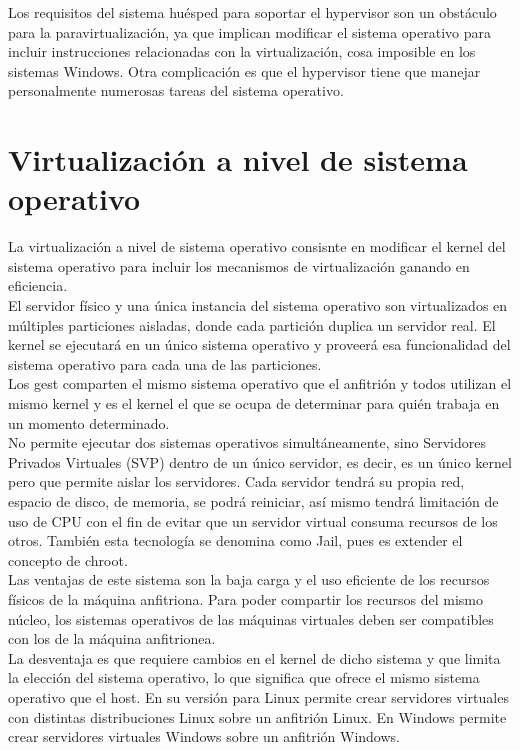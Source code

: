 \documentclass[10pt,a4paper,spanish]{report}
\begin{document}
  \noindent
  Los requisitos del sistema huésped para soportar el hypervisor son un obstáculo para la paravirtualización, ya que implican modificar el sistema operativo para incluir instrucciones relacionadas con la virtualización, cosa imposible en los sistemas Windows. Otra complicación es que el hypervisor tiene que manejar personalmente numerosas tareas del sistema operativo.

  \section{Virtualización a nivel de sistema operativo}

  \noindent
  La virtualización a nivel de sistema operativo consisnte en modificar el kernel del sistema operativo para incluir los mecanismos de virtualización ganando en eficiencia. \\

  \noindent
  El servidor físico y una única instancia del sistema operativo son virtualizados en múltiples particiones aisladas, donde cada partición duplica un servidor real. El kernel se ejecutará en un único sistema operativo y proveerá esa funcionalidad del sistema operativo para cada una de las particiones.\\

  \noindent
  Los gest comparten el mismo sistema operativo que el anfitrión y todos utilizan el mismo kernel y es el kernel el que se ocupa de determinar para quién trabaja en un momento determinado. \\

  \noindent
  No permite ejecutar dos sistemas operativos simultáneamente, sino Servidores Privados Virtuales (SVP) dentro de un único servidor, es decir, es un único kernel pero que permite aislar los servidores. Cada servidor tendrá su propia red, espacio de disco, de memoria, se podrá reiniciar, así mismo tendrá limitación de uso de CPU con el fin de evitar que un servidor virtual consuma recursos de los otros. También esta tecnología se denomina como Jail, pues es extender el concepto de chroot.\\

  \noindent
  Las ventajas de este sistema son la baja carga y el uso eficiente de los recursos físicos de la máquina anfitriona. Para poder compartir los recursos del mismo núcleo, los sistemas operativos de las máquinas virtuales deben ser compatibles con los de la máquina anfitrionea. \\

  \newpage
  \noindent
  La desventaja es que requiere cambios en el kernel de dicho sistema y que limita la elección del sistema operativo, lo que significa que ofrece el mismo sistema operativo que el host. En su versión para Linux permite crear servidores virtuales con distintas distribuciones Linux sobre un anfitrión Linux. En Windows permite crear servidores virtuales Windows sobre un anfitrión Windows. \\
\end{document}
